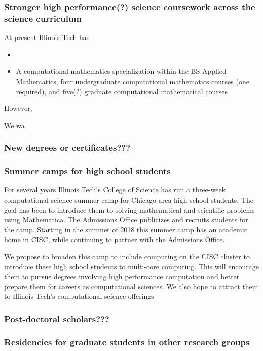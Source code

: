 \documentclass[11pt]{NSFamsart}
\begin{document}
\subsubsection*{Stronger high performance(?) science coursework across the science curriculum} At present Illinois Tech has   
\begin{itemize} 

\item {}

\item A computational mathematics specialization within the BS Applied Mathematics, four undergraduate computational mathematics courses (one required), and five(?) graduate computational mathematical courses

\end{itemize}

However, 

We wa
\subsubsection*{New degrees or certificates???}

\subsubsection*{Summer camps for high school students} For several years Illinois Tech's College of Science has run a three-week computational science summer camp for Chicago area high school students.  The goal has been to introduce them to solving mathematical and scientific problems using Mathematica.  The Admissions Office publicizes and recruits students for the camp.  Starting in the summer of 2018 this summer camp has an academic home in CISC, while continuing to partner with the Admissions Office.

We propose to broaden this camp to include computing on the CISC cluster to introduce these high school students to multi-core computing.  This will encourage them to pursue degrees involving high performance computation and better prepare them for careers as computational sciences.  We also hope to attract them to Illinois Tech's computational science offerings


\subsubsection*{Post-doctoral scholars???} 
\subsubsection*{Residencies for graduate students in other research groups}
\end{document}

